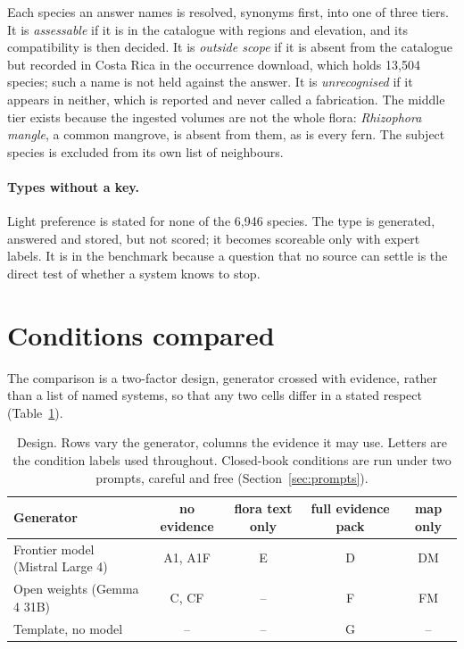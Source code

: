 \documentclass[11pt,a4paper]{article}
\begin{document}
Each species an answer names is resolved, synonyms first, into one of three tiers. It
is \emph{assessable} if it is in the catalogue with regions and elevation, and its
compatibility is then decided. It is \emph{outside scope} if it is absent from the
catalogue but recorded in Costa Rica in the occurrence download, which holds
13{,}504 species; such a name is not held against the answer. It is
\emph{unrecognised} if it appears in neither, which is reported and never called a
fabrication. The middle tier exists because the ingested volumes are not the whole
flora: \emph{Rhizophora mangle}, a common mangrove, is absent from them, as is every
fern. The subject species is excluded from its own list of neighbours.

\paragraph{Types without a key.} Light preference is stated for none of the 6{,}946
species. The type is generated, answered and stored, but not scored; it becomes
scoreable only with expert labels. It is in the benchmark because a question that no
source can settle is the direct test of whether a system knows to stop.

\section{Conditions compared}\label{sec:systems}

The comparison is a two-factor design, generator crossed with evidence, rather than a
list of named systems, so that any two cells differ in a stated respect
(Table~\ref{tab:design}).

\begin{table}[htbp]
\centering
\caption{Design. Rows vary the generator, columns the evidence it may use. Letters
are the condition labels used throughout. Closed-book conditions are run under two
prompts, careful and free (Section~\ref{sec:prompts}).}
\label{tab:design}
\small
\begin{tabular}{lcccc}
\toprule
Generator & no evidence & flora text only & full evidence pack & map only \\
\midrule
Frontier model (Mistral Large 4)   & A1, A1F & E  & D & DM \\
Open weights (Gemma 4 31B)         & C, CF   & -- & F & FM \\
Template, no model                 & --      & -- & G & -- \\
\bottomrule
\end{tabular}
\end{table}
\end{document}
